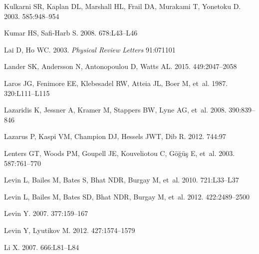 \documentclass[letterpaper]{ar-1col}
\begin{document}
\begin{thebibliography}{}
{Kulkarni} SR, {Kaplan} DL, {Marshall} HL, {Frail} DA, {Murakami} T, {Yonetoku}
  D. 2003.
\textit{\apj} 585:948--954

{Kumar} HS, {Safi-Harb} S. 2008.
\textit{\apj} 678:L43--L46

{Lai} D, {Ho} WC. 2003.
\textit{Physical Review Letters} 91:071101

{Lander} SK, {Andersson} N, {Antonopoulou} D, {Watts} AL. 2015.
\textit{\mnras} 449:2047--2058

{Laros} JG, {Fenimore} EE, {Klebesadel} RW, {Atteia} JL, {Boer} M, et~al. 1987.
\textit{\apjl} 320:L111--L115

{Lazaridis} K, {Jessner} A, {Kramer} M, {Stappers} BW, {Lyne} AG, et~al. 2008.
\textit{\mnras} 390:839--846

{Lazarus} P, {Kaspi} VM, {Champion} DJ, {Hessels} JWT, {Dib} R. 2012.
\textit{\apj} 744:97

{Lenters} GT, {Woods} PM, {Goupell} JE, {Kouveliotou} C, {G{\"o}{\u g}{\"u}{\c
  s}} E, et~al. 2003.
\textit{\apj} 587:761--770

{Levin} L, {Bailes} M, {Bates} S, {Bhat} NDR, {Burgay} M, et~al. 2010.
\textit{\apjl} 721:L33--L37

{Levin} L, {Bailes} M, {Bates} SD, {Bhat} NDR, {Burgay} M, et~al. 2012.
\textit{\mnras} 422:2489--2500

{Levin} Y. 2007.
\textit{\mnras} 377:159--167

{Levin} Y, {Lyutikov} M. 2012.
\textit{\mnras} 427:1574--1579

{Li} X. 2007.
\textit{\apj} 666:L81--L84


\end{thebibliography}
\end{document}
